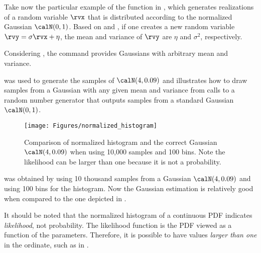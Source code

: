 Take now the particular example of the function  in \matlab, which generates realizations of a random variable $\rvx$ that is distributed according to the normalized
Gaussian $\calN(0,1)$. Based on  and , if one creates a new random variable $\rvy = \sigma \rvx + \eta$, the mean and variance of $\rvy$ are $\eta$ and $\sigma^2$, respectively.

Considering \matlab, the command  provides Gaussians with arbitrary mean and variance. 

 was used to generate the samples of $\calN(4,0.09)$ and illustrates how to draw samples from a Gaussian with any given mean and variance from calls to a random number generator that outputs samples from a standard Gaussian $\calN(0,1)$.


\begin{figure}
	\centering
		\texttt{[image: Figures/normalized\_histogram]}		
	\caption[Comparison of normalized histogram and the correct Gaussian $\calN(4,0.09)$ when using 10,000 samples and 100 bins]{Comparison of normalized histogram and the correct Gaussian $\calN(4,0.09)$ when using 10,000 samples and 100 bins. Note the likelihood can be larger than one because it is not a probability.\label{fig:normalized_histogram}}
\end{figure}

 was obtained by using 10 thousand samples from a Gaussian $\calN(4,0.09)$ and using 100 bins for the histogram. Now the Gaussian estimation is relatively good when compared to the one depicted in . 

It should be noted that the normalized histogram of a continuous PDF indicates \emph{likelihood}, not probability. The likelihood function is the PDF viewed as a
function of the parameters. Therefore, it is possible to have values \emph{larger than one} in the ordinate, such as in .
\eExample

